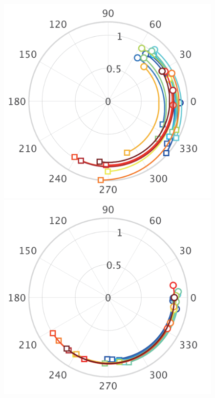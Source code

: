 \documentclass[tombow,dvipdfmx]{corona-a5-1.1}
\begin{document}
\begin{figure}[t!]
  \centering
  {
  \begin{minipage}{0.49\linewidth}
    \centering
    \includegraphics[width = 0.9\linewidth]{figs/Epolar}
    \medskip
  \end{minipage}
  \begin{minipage}{0.49\linewidth}
    \centering
    \includegraphics[width = 0.9\linewidth]{figs/Vpolar}
    \medskip

\end{minipage}}
\end{figure}
\end{document}
